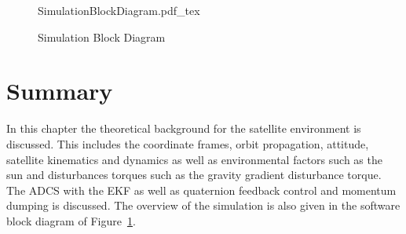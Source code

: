 \begin{figure}[!htb]
	\centering
	\def\svgwidth{18cm}
	{SimulationBlockDiagram.pdf_tex}
	\caption{Simulation Block Diagram}
	\label{fig:SimulatinBlockDiagram}
\end{figure}

\section{Summary}
In this chapter the theoretical background for the satellite environment is discussed. This includes the coordinate frames, orbit propagation, attitude, satellite kinematics and dynamics as well as environmental factors such as the sun and disturbances torques such as the gravity gradient disturbance torque. The ADCS with the EKF as well as quaternion feedback control and momentum dumping is discussed. The overview of the simulation is also given in the software block diagram of Figure~\ref{fig:SimulatinBlockDiagram}.